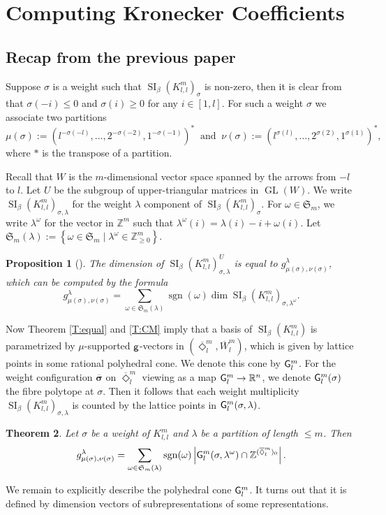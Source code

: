 \documentclass{amsart}
\newtheorem{theorem}{Theorem}[section]
\newtheorem{proposition}[theorem]{Proposition}
\theoremstyle{definition}
\theoremstyle{remark}
\numberwithin{equation}{section}
\DeclareMathOperator{\GL}{GL}
\DeclareMathOperator{\SI}{SI}
\newcommand{\op}[1]{\operatorname{#1}}
\newcommand{\mb}[1]{\mathbb{#1}}
\newcommand{\mr}[1]{{\sf #1}}%
\newcommand{\mf}[1]{\mathfrak{#1}}
\newcommand{\bs}[1]{\boldsymbol{#1}}
\newcommand{\br}[1]{\overline{#1}}
\newcommand{\g}{{\sf g}}
\newcommand{\kllm}{{K_{l,l}^m}}
\begin{document}
\section{Computing Kronecker Coefficients} \label{S:KC}
\subsection{Recap from the previous paper} \label{ss:recap}
Suppose $\sigma$ is a weight such that $\SI_\beta(\kllm)_\sigma$ is non-zero,
then it is clear from \cite[Theorem 3]{DW1} that $\sigma(-i)\leq 0$ and $\sigma(i)\geq 0$ for any $i\in [1,l]$.
For such a weight $\sigma$ we associate two partitions 
$$\mu(\sigma):=\left(l^{-\sigma(-l)},\dots,2^{-\sigma(-2)},1^{-\sigma(-1)}\right)^*\ \text{ and }\ \nu(\sigma):=\left(l^{\sigma(l)}, \dots, 2^{\sigma(2)}, 1^{\sigma(1)}\right)^*,$$
where $*$ is the transpose of a partition. 

Recall that $W$ is the $m$-dimensional vector space spanned by the arrows from $-l$ to $l$.
Let $U$ be the subgroup of upper-triangular matrices in $\GL(W)$.
We write $\SI_\beta(\kllm)_{\sigma,\lambda}$ for the weight $\lambda$ component of $\SI_\beta(\kllm)_\sigma$.
For $\omega\in \mf{S}_m$, we write $\lambda^\omega$ for the vector in $\mb{Z}^m$ such that $\lambda^\omega(i)= \lambda(i)-i+\omega(i)$. Let $\mf{S}_m(\lambda):=\left\{\omega\in \mf{S}_m \mid \lambda^\omega\in \mb{Z}_{\geq 0}^m \right\}$.

\begin{proposition}[{\cite[Corollary 3.2 and 3.4]{Fk1}}] \label{P:KC} The dimension of $\SI_\beta(\kllm)_{\sigma,\lambda}^U$ is equal to $g_{\mu(\sigma),\nu(\sigma)}^\lambda$, which can be computed by the formula
	$$g_{\mu(\sigma),\nu(\sigma)}^\lambda = \sum_{\omega\in \mf{S}_m(\lambda)} \op{sgn}(\omega) \dim \SI_\beta(\kllm)_{\sigma,\lambda^\omega}.$$
\end{proposition}

Now Theorem \ref{T:equal} and \ref{T:CM} imply that a basis of $\SI_\beta(\kllm)$ is parametrized by $\mu$-supported $\g$-vectors in $(\br{\Diamond}_{l}^m,\br{W}_l^m)$, which is given by lattice points in some rational polyhedral cone.
We denote this cone by ${\sf G}_l^m$.
For the weight configuration $\br{\bs{\sigma}}$ on $\br{\Diamond}_l^m$ viewing as a map ${\sf G}_l^m \to \mb{R}^{n}$, we denote ${\sf G}_l^m(\sigma)$ the fibre polytope at $\sigma$.
Then it follows that each weight multiplicity $\SI_\beta(\kllm)_{\sigma,\lambda}$ is counted by the lattice points in ${\sf G}_l^m(\sigma,\lambda)$. 
\begin{theorem} \label{T:KC} Let $\sigma$ be a weight of $\kllm$ and $\lambda$ be a partition of length $\leq m$. Then
	$$g_{\mu(\sigma),\nu(\sigma)}^\lambda = \sum_{\omega\in \mf{S}_m(\lambda)} \op{sgn}(\omega) \left|\mr{G}_l^m(\sigma,\lambda^\omega)\cap \mb{Z}^{(\br{\Diamond}_l^m)_0}\right|.$$
\end{theorem}
We remain to explicitly describe the polyhedral cone $\mr{G}_l^m$.
It turns out that it is defined by dimension vectors of subrepresentations of some representations.
\end{document}

